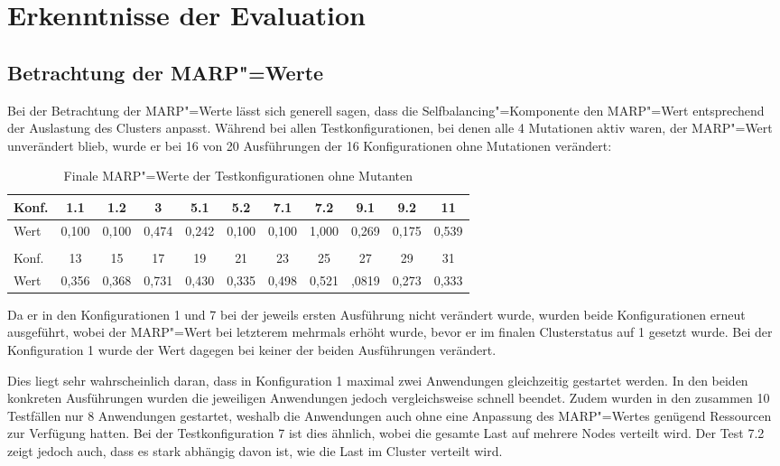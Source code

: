 \section{Erkenntnisse der Evaluation}
\label{sec:evaluationResults}


\subsection{Betrachtung der \ac{MARP}"=Werte}
\label{sec:marpValueResults}

Bei der Betrachtung der \ac{MARP}"=Werte lässt sich generell sagen, dass die Selfbalancing"=Komponente den \ac{MARP}"=Wert entsprechend der Auslastung des Clusters anpasst.
Während bei allen Testkonfigurationen, bei denen alle 4 Mutationen aktiv waren, der \ac{MARP}"=Wert unverändert blieb, wurde er bei 16 von 20 Ausführungen der 16 Konfigurationen ohne Mutationen verändert:

\begin{table}[h]
    \begin{tabular}{l|c|c|c|c|c|c|c|c|c|c}
    	Konf. &  1.1  &  1.2  &   3   &  5.1  &  5.2  &  7.1  &  7.2  &  9.1  &  9.2  &  11   \\ \hline
    	Wert  & 0,100 & 0,100 & 0,474 & 0,242 & 0,100 & 0,100 & 1,000 & 0,269 & 0,175 & 0,539 \\
    	\multicolumn{11}{c}{} \\
    	Konf. &  13   &  15   &  17   &  19   &  21   &  23   &  25   &  27   &  29   &  31   \\ \hline
    	Wert  & 0,356 & 0,368 & 0,731 & 0,430 & 0,335 & 0,498 & 0,521 & ,0819 & 0,273 & 0,333
    \end{tabular}
    \caption{Finale \ac{MARP}"=Werte der Testkonfigurationen ohne Mutanten}
    \label{tab:finalMarpValues}
\end{table}

Da er in den Konfigurationen 1 und 7 bei der jeweils ersten Ausführung nicht verändert wurde, wurden beide Konfigurationen erneut ausgeführt, wobei der \ac{MARP}"=Wert bei letzterem mehrmals erhöht wurde, bevor er im finalen Clusterstatus auf 1 gesetzt wurde.
Bei der Konfiguration 1 wurde der Wert dagegen bei keiner der beiden Ausführungen verändert.

Dies liegt sehr wahrscheinlich daran, dass in Konfiguration 1 maximal zwei Anwendungen gleichzeitig gestartet werden.
In den beiden konkreten Ausführungen wurden die jeweiligen Anwendungen jedoch vergleichsweise schnell beendet.
Zudem wurden in den zusammen 10 Testfällen nur 8 Anwendungen gestartet, weshalb die Anwendungen auch ohne eine Anpassung des \ac{MARP}"=Wertes genügend Ressourcen zur Verfügung hatten.
Bei der Testkonfiguration 7 ist dies ähnlich, wobei die gesamte Last auf mehrere Nodes verteilt wird.
Der Test 7.2 zeigt jedoch auch, dass es stark abhängig davon ist, wie die Last im Cluster verteilt wird.

